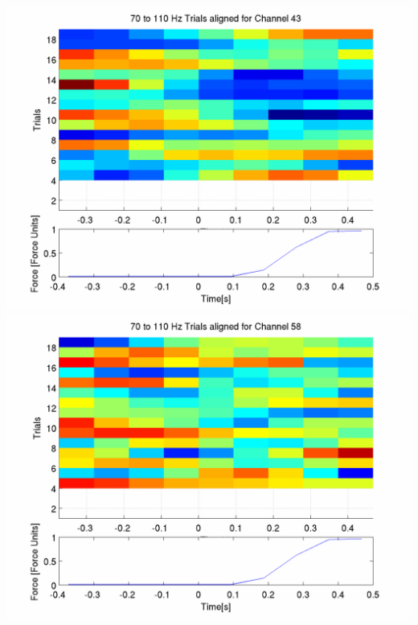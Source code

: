 \documentclass[12pt]{article}
\begin{document}
\includegraphics[scale=0.2]{log_plot_5_aligned_trials.png}
\includegraphics[scale=0.2]{log_plot_6_aligned_trials.png}
\end{document}
